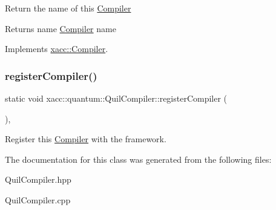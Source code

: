 Return the name of this \hyperlink{a02448}{Compiler} \begin{DoxyReturn}{Returns}
name \hyperlink{a02448}{Compiler} name 
\end{DoxyReturn}


Implements \hyperlink{a02448_a87fca9100e6462122f5b687c3a0fb3fb}{xacc\+::\+Compiler}.

\mbox{\label{a01204_aaec99a14bede717bf02a0f65af2a3c69}} 
\subsubsection{\texorpdfstring{register\+Compiler()}{registerCompiler()}}
{\footnotesize\ttfamily static void xacc\+::quantum\+::\+Quil\+Compiler\+::register\+Compiler (\begin{DoxyParamCaption}{ }\end{DoxyParamCaption})\hspace{0.3cm}{\ttfamily [inline]}, {\ttfamily [static]}}

Register this \hyperlink{a02448}{Compiler} with the framework. 

The documentation for this class was generated from the following files\+:\begin{DoxyCompactItemize}
\item 
Quil\+Compiler.\+hpp\item 
Quil\+Compiler.\+cpp\end{DoxyCompactItemize}
